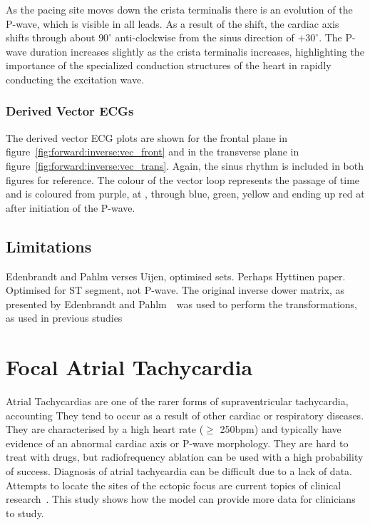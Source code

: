As the pacing site moves down the crista terminalis there is an evolution of the
P-wave, which is visible in all leads.
As a result of the shift, the cardiac axis shifts through about $90^\circ$
anti-clockwise from the sinus direction of $+30^\circ$.
The P-wave duration increases slightly as the crista terminalis increases,
highlighting the importance of the specialized conduction structures of the
heart in rapidly conducting the excitation wave.


\subsubsection{Derived Vector ECGs}

The derived vector ECG plots are shown for the frontal plane in
figure~\ref{fig:forward:inverse:vec_front} and in the transverse plane in
figure~\ref{fig:forward:inverse:vec_trans}.
Again, the sinus rhythm is included in both figures for reference.
The colour of the vector loop represents the passage of time and is coloured
from purple, at , through blue, green, yellow and ending up red at
 after initiation of the P-wave.

\subsection{Limitations}

Edenbrandt and Pahlm verses Uijen, optimised sets.  Perhaps Hyttinen paper.
Optimised for ST segment, not P-wave.
The original inverse dower matrix, as presented by Edenbrandt and
Pahlm~\cite{Edenbrandt1988}\ was used to perform the transformations, as used in
previous studies~\cite{Carlson2005,Holmqvist2007,Havmoller2007}

\section{Focal Atrial Tachycardia}

Atrial Tachycardias are one of the rarer forms of supraventricular
tachycardia, accounting 
They tend to occur as a result of other cardiac or respiratory diseases.
They are characterised by a high heart rate ($\geq$ \unit{250}{bpm}) and
typically have evidence of an abnormal cardiac axis or P-wave morphology.
They are hard to treat with drugs, but radiofrequency ablation can be used with
a high probability of success.
Diagnosis of atrial tachycardia can be difficult due to a lack of data.
Attempts to locate the sites of the ectopic focus are current topics of clinical
research~\cite{Kistler2006,Kahn2006,Yamane2001}.
This study shows how the model can provide more data for clinicians to study.

